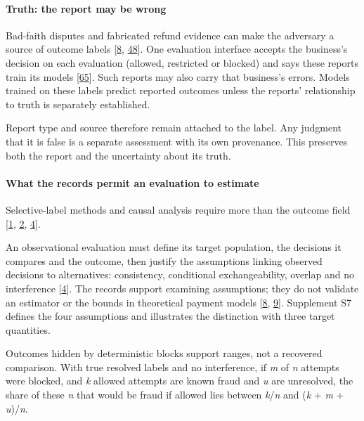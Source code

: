 \documentclass[
  11pt,
]{article}
\begin{document}
\hypertarget{truth-the-report-may-be-wrong}{%
\paragraph{Truth: the report may be
wrong}\label{truth-the-report-may-be-wrong}}

Bad-faith disputes and fabricated refund evidence can make the adversary
a source of outcome labels
{[}\protect\hyperlink{ref-Dhama2026Causal}{8},
\protect\hyperlink{ref-Zhang2026Refund}{48}{]}. One evaluation interface
accepts the business's decision on each evaluation (allowed, restricted
or blocked) and says these reports train its models
{[}\protect\hyperlink{ref-Stripe2026CAE}{65}{]}. Such reports may also
carry that business's errors. Models trained on these labels predict
reported outcomes unless the reports' relationship to truth is
separately established.

Report type and source therefore remain attached to the label. Any
judgment that it is false is a separate assessment with its own
provenance. This preserves both the report and the uncertainty about its
truth.

\hypertarget{what-the-records-permit-an-evaluation-to-estimate}{%
\paragraph{What the records permit an evaluation to
estimate}\label{what-the-records-permit-an-evaluation-to-estimate}}

Selective-label methods and causal analysis require more than the
outcome field {[}\protect\hyperlink{ref-Lakkaraju2017Selective}{1},
\protect\hyperlink{ref-Kilbertus2020Fair}{2},
\protect\hyperlink{ref-HernanRobins2020}{4}{]}.

An observational evaluation must define its target population, the
decisions it compares and the outcome, then justify the assumptions
linking observed decisions to alternatives: consistency, conditional
exchangeability, overlap and no interference
{[}\protect\hyperlink{ref-HernanRobins2020}{4}{]}. The records support
examining assumptions; they do not validate an estimator or the bounds
in theoretical payment models
{[}\protect\hyperlink{ref-Dhama2026Causal}{8},
\protect\hyperlink{ref-Dhama2026Limits}{9}{]}. Supplement S7 defines the
four assumptions and illustrates the distinction with three target
quantities.

Outcomes hidden by deterministic blocks support ranges, not a recovered
comparison. With true resolved labels and no interference, if \emph{m}
of \emph{n} attempts were blocked, and \emph{k} allowed attempts are
known fraud and \emph{u} are unresolved, the share of these \emph{n}
that would be fraud if allowed lies between \emph{k}/\emph{n} and
(\emph{k} + \emph{m} + \emph{u})/\emph{n}.
\end{document}
